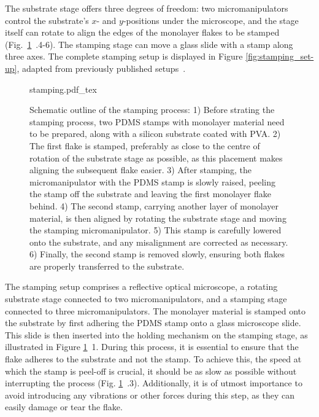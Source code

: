 The substrate stage offers three degrees of freedom: two micromanipulators control the substrate's $x$- and $y$-positions under the microscope, and the stage itself can rotate to align the edges of the monolayer flakes to be stamped (Fig.~\ref{fig:stamping_process}~.4-6).
%
The stamping stage can move a glass slide with a stamp along three axes.
%
The complete stamping setup is displayed in Figure \ref{fig:stamping_set-up}, adapted  from previously published setups~\cite{castellanos-gomezDeterministicTransferTwodimensional2014, castellanos-gomezDeterministicTransferTwodimensional2014a}.

\begin{figure}[h]
	\centering
	\def\svgwidth{1\linewidth}
	{stamping.pdf_tex}
	\caption{Schematic outline of the stamping process: 1) Before strating the stamping process, two PDMS stamps with monolayer material need to be prepared, along with a silicon substrate coated with PVA.
    2) The first flake is stamped, preferably as close to the centre of rotation of the substrate stage as possible, as this placement makes aligning the subsequent flake easier.
    3) After stamping, the micromanipulator with the PDMS stamp is slowly raised, peeling the stamp off the substrate and leaving the first monolayer flake behind. 
    4) The second stamp, carrying another layer of monolayer material, is then aligned by rotating the substrate stage and moving the stamping micromanipulator. 
    5) This stamp is carefully lowered onto the substrate, and any misalignment are corrected as necessary. 
    6) Finally, the second stamp is removed slowly, ensuring both flakes are properly transferred to the substrate.}
    
\label{fig:stamping_process}
\end{figure}

The stamping setup comprises a reflective optical microscope, a rotating substrate stage connected to two micromanipulators, and a stamping stage connected to three micromanipulators.
%
The monolayer material is stamped onto the substrate by first adhering the PDMS stamp onto a glass microscope slide.
%
This slide is then inserted into the holding mechanism on the stamping stage, as illustrated in Figure \ref{fig:stamping_process}~1.
%
During this process, it is essential to ensure that the flake adheres to the substrate and not the stamp.
%
To achieve this, the speed at which the stamp is peel-off is crucial, it should be as slow as possible without interrupting the process (Fig. \ref{fig:stamping_process}~.3).
%
Additionally, it is of utmost importance to avoid introducing any vibrations or other forces during this step, as they can easily damage or tear the flake.

